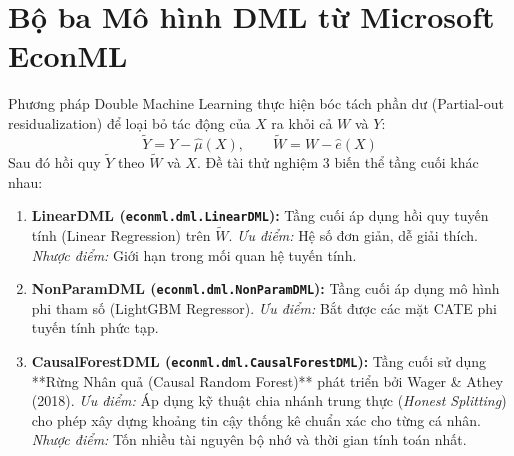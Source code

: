 \section{Bộ ba Mô hình DML từ Microsoft EconML}

Phương pháp Double Machine Learning thực hiện bóc tách phần dư (Partial-out residualization) để loại bỏ tác động của $X$ ra khỏi cả $W$ và $Y$:
\begin{equation}
    \tilde{Y} = Y - \hat{\mu}(X), \qquad \tilde{W} = W - \hat{e}(X)
\end{equation}
Sau đó hồi quy $\tilde{Y}$ theo $\tilde{W}$ và $X$. Đề tài thử nghiệm 3 biến thể tầng cuối khác nhau:

\begin{enumerate}[leftmargin=*]
    \item \textbf{LinearDML (\texttt{econml.dml.LinearDML}):}
    Tầng cuối áp dụng hồi quy tuyến tính (Linear Regression) trên $\tilde{W}$. 
    \textit{Ưu điểm:} Hệ số đơn giản, dễ giải thích. \textit{Nhược điểm:} Giới hạn trong mối quan hệ tuyến tính.

    \item \textbf{NonParamDML (\texttt{econml.dml.NonParamDML}):}
    Tầng cuối áp dụng mô hình phi tham số (LightGBM Regressor). 
    \textit{Ưu điểm:} Bắt được các mặt CATE phi tuyến tính phức tạp.

    \item \textbf{CausalForestDML (\texttt{econml.dml.CausalForestDML}):}
    Tầng cuối sử dụng **Rừng Nhân quả (Causal Random Forest)** phát triển bởi Wager \& Athey (2018).
    \textit{Ưu điểm:} Áp dụng kỹ thuật chia nhánh trung thực (\textit{Honest Splitting}) cho phép xây dựng khoảng tin cậy thống kê chuẩn xác cho từng cá nhân. \textit{Nhược điểm:} Tốn nhiều tài nguyên bộ nhớ và thời gian tính toán nhất.
\end{enumerate}
